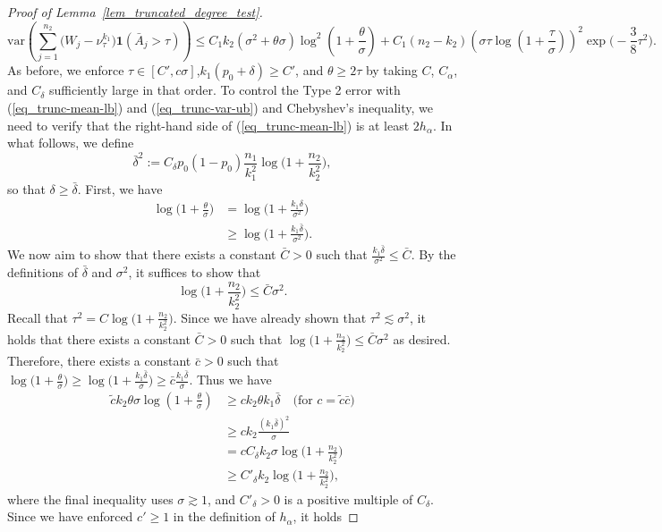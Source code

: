 \documentclass{article}
\newcommand{\var}{\textrm{var}}
\newcommand{\one}{\mathbf{1}}
\begin{document}
\begin{proof}[Proof of Lemma~\ref{lem_truncated_degree_test}]
\begin{equation}
    \var\left(\sum_{j = 1}^{n_2}\big(W_{j} - \nu^{k_1}_{\tau}\big)\one(\bar{A}_{j} > \tau)\right) \leq C_1 k_2 (\sigma^2 + \theta \sigma) \log^2\left(1 + \frac{\theta}{\sigma}\right) + C_1 (n_2 - k_2)\left(\sigma \tau \log(1 + \frac{\tau}{\sigma})\right)^2\exp\big(-\frac38 \tau^2\big).
\end{equation}
As before, we enforce $\tau \in [C', c\sigma]$,$k_1 (p_0 + \delta) \geq C'$,  and $\theta \geq 2\tau$ by taking $C$, $C_\alpha$, and $C_\delta$ sufficiently large in that order. To control the Type 2 error with (\ref{eq_trunc-mean-lb}) and (\ref{eq_trunc-var-ub}) and Chebyshev's inequality, we need to verify that the right-hand side of (\ref{eq_trunc-mean-lb}) is at least $2h_\alpha$. In what follows, we define
\[\bar{\delta}^2 := C_\delta p_0(1-p_0)\frac{n_1}{k^2_1}\log\Big(1 + \frac{n_2}{k_2^2}\Big),\]
so that $\delta \geq \bar{\delta}$. First, we have
\begin{align*}
    \log\Big(1 + \frac{\theta}{\sigma}\Big) &= \log\Big(1 + \frac{k_1\delta}{\sigma^2}\Big) \\
    &\geq \log\Big(1 + \frac{k_1\bar{\delta}}{\sigma^2}\Big).
\end{align*}
We now aim to show that there exists a constant $\bar{C} > 0$ such that $\frac{k_1\bar{\delta}}{\sigma^2} \leq \bar{C}$. By the definitions of $\bar{\delta}$ and $\sigma^2$, it suffices to show that 
\[\log\Big(1 + \frac{n_2}{k_2^2}\Big) \leq \bar{C}\sigma^2.\]
Recall that $\tau^2 = C\log\big(1 + \frac{n_2}{k_2^2}\big)$. Since we have already shown that $\tau^2 \lesssim \sigma^2$, it holds that there exists a constant $\bar{C} > 0$ such that $\log\Big(1 + \frac{n_2}{k_2^2}\Big) \leq \bar{C}\sigma^2$ as desired. Therefore, there exists a constant $\bar{c} > 0$ such that $\log\big(1 + \frac{\theta}{\sigma}\big) \geq \log\big(1 + \frac{k_1\bar{\delta}}{\sigma}\big) \geq \bar{c}\frac{k_1\bar{\delta}}{\sigma}$. Thus we have
\begin{align*}
    \tilde{c}k_2\theta \sigma \log\left(1 + \frac{\theta}{\sigma}\right) &\geq  ck_2\theta k_1 \bar{\delta} \quad \text{(for $c = \tilde{c}\bar{c}$)} \\
    &\geq c k_2 \frac{(k_1 \bar{\delta})^2}{\sigma} \\
    &= c C_\delta k_2 \sigma \log\Big(1 + \frac{n_2}{k_2^2}\Big) \\
    &\geq C'_\delta k_2 \log\Big(1 + \frac{n_2}{k_2^2}\Big),
\end{align*}
where the final inequality uses $\sigma \gtrsim 1$, and $C'_\delta > 0$ is a positive multiple of $C_\delta$. Since we have enforced $c' \geq 1$ in the definition of $h_\alpha$, it holds

\end{proof}
\end{document}
